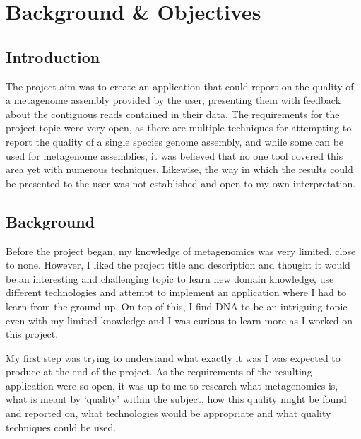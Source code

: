 \chapter{Background \& Objectives}


\section{Introduction}
The project aim was to create an application that could report on the quality of a metagenome assembly  provided by the user, presenting them with feedback about the contiguous reads contained in their data. The requirements for the project topic were very open, as there are multiple techniques for attempting to report the quality of a single species genome assembly, and while some can be used for metagenome assemblies, it was believed that no one tool covered this area yet with numerous techniques. Likewise, the way in which the results could be presented to the user was not established and open to my own interpretation.


\section{Background}
Before the project began, my knowledge of metagenomics was very limited, close to none. However, I liked the project title and description and thought it would be an interesting and challenging topic to learn new domain knowledge, use different technologies and attempt to implement an application where I had to learn from the ground up. On top of this, I find DNA to be an intriguing topic even with my limited knowledge and I was curious to learn more as I worked on this project.

My first step was trying to understand what exactly it was I was expected to produce at the end of the project. As the requirements of the resulting application were so open, it was up to me to research what metagenomics is, what is meant by `quality' within the subject, how this quality might be found and reported on, what technologies would be appropriate and what quality techniques could be used.

